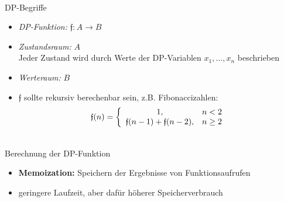 \documentclass[hyphens,compress,fleqn]{beamer}
\begin{document}
	\begin{frame}{{\footnotesize\insertsectionhead\\}DP-Begriffe}
		\begin{itemize}[<+->]
			\item \textit{DP-Funktion:} $\mathfrak{f}: A \rightarrow B$
			\item \textit{Zustandsraum:} $A$ \\
			Jeder Zustand wird durch Werte der DP-Variablen $x_1,\dots,x_n$ beschrieben
			\item \textit{Werteraum:} $B$
			\item $\mathfrak{f}$ sollte rekursiv berechenbar sein, z.B. Fibonaccizahlen:
			\[
			\mathfrak{f}(n) = \left\{\begin{array}{c c}
			1, & n < 2\\
			\mathfrak{f}(n-1) + \mathfrak{f}(n-2), & n \ge 2
			\end{array}\right.
			\]
			
		\end{itemize}
	\end{frame}

	\begin{frame}{{\footnotesize\insertsectionhead\\}Berechnung der DP-Funktion}
		\begin{itemize}[<+->]
			\item \textbf{Memoization:} Speichern der Ergebnisse von Funktionsaufrufen
			\item geringere Laufzeit, aber dafür höherer Speicherverbrauch
		\end{itemize}
	\end{frame}
\end{document}
